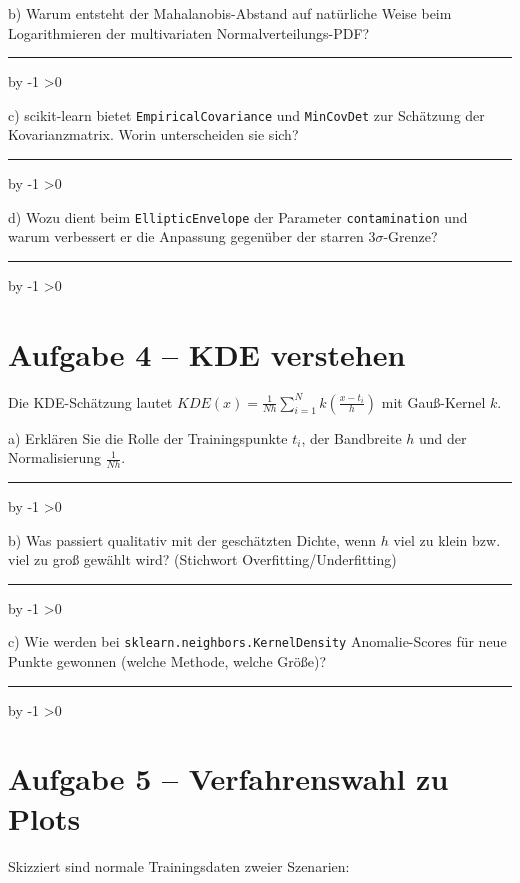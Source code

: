\documentclass[10pt,a4paper]{article}
\newcommand{\antwortlinien}[1]{%
  \par\vspace{2pt}%
  \newcount\zeilen \zeilen=#1
  \loop
    \noindent\rule{\linewidth}{0.4pt}\par\vspace{11pt}%
    \advance\zeilen by -1
  \ifnum\zeilen>0 \repeat
}
\begin{document}
b) Warum entsteht der Mahalanobis-Abstand auf natürliche Weise beim Logarithmieren der
multivariaten Normalverteilungs-PDF?
\antwortlinien{3}

c) scikit-learn bietet \texttt{EmpiricalCovariance} und \texttt{MinCovDet} zur Schätzung
der Kovarianzmatrix. Worin unterscheiden sie sich?
\antwortlinien{2}

d) Wozu dient beim \texttt{EllipticEnvelope} der Parameter \texttt{contamination}
und warum verbessert er die Anpassung gegenüber der starren 3$\sigma$-Grenze?
\antwortlinien{3}

\section*{Aufgabe 4 -- KDE verstehen}

Die KDE-Schätzung lautet
$KDE(x) = \frac{1}{Nh}\sum_{i=1}^{N} k\!\left(\frac{x - t_i}{h}\right)$
mit Gauß-Kernel $k$.

a) Erklären Sie die Rolle der Trainingspunkte $t_i$, der Bandbreite $h$ und der
Normalisierung $\frac{1}{Nh}$.
\antwortlinien{3}

b) Was passiert qualitativ mit der geschätzten Dichte, wenn $h$ viel zu klein bzw.
viel zu groß gewählt wird? (Stichwort Overfitting/Underfitting)
\antwortlinien{3}

c) Wie werden bei \texttt{sklearn.neighbors.KernelDensity} Anomalie-Scores für neue
Punkte gewonnen (welche Methode, welche Größe)?
\antwortlinien{2}

\section*{Aufgabe 5 -- Verfahrenswahl zu Plots}

Skizziert sind normale Trainingsdaten zweier Szenarien:

\begin{center}
\end{center}
\end{document}
